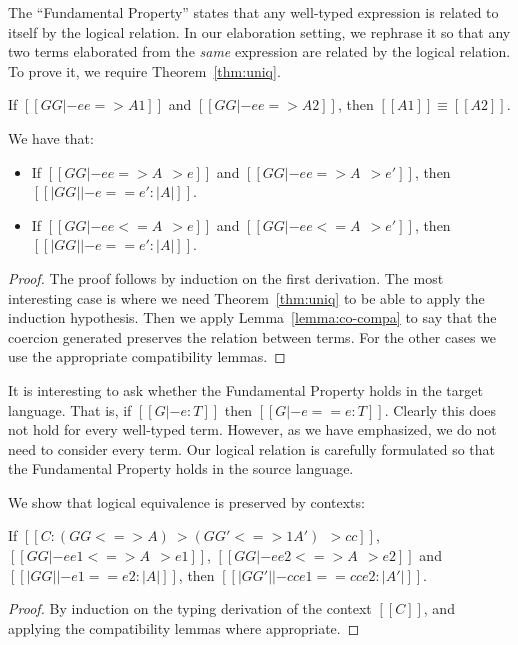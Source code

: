 The ``Fundamental Property'' states that any well-typed expression is related to
itself by the logical relation. In our elaboration setting, we rephrase it so
that any two \tname terms elaborated from the \textit{same} \name expression are related
by the logical relation. To prove it, we require Theorem~\ref{thm:uniq}.

\begin{theorem} \label{thm:uniq}
  If $[[GG |- ee => A1]]$ and $[[GG |- ee => A2]]$, then $[[A1]] \equiv [[A2]]$.
\end{theorem}

\begin{theorem}  \label{thm:co-log} We have that:
  \begin{itemize}
  \item If $[[GG |- ee => A ~~> e]]$ and $[[GG |- ee => A ~~> e']]$, then $[[|GG| |- e == e' : |A| ]]$.
  \item If $[[GG |- ee <= A ~~> e]]$ and $[[GG |- ee <= A ~~> e']]$, then $[[|GG| |- e == e' : |A| ]]$.
  \end{itemize}
\end{theorem}
\begin{proof}
  The proof follows by induction on the first derivation. The most interesting case is 
  where we need Theorem~\ref{thm:uniq} to be able to
  apply the induction hypothesis. Then we apply Lemma~\ref{lemma:co-compa} to say
  that the coercion generated preserves the relation between terms. For the other cases
  we use the appropriate compatibility lemmas.
\end{proof}
\begin{remark}
  It is interesting to ask whether the Fundamental Property holds in the target language. That is,
  if $[[G |- e : T]]$ then $[[G |- e == e : T]]$. Clearly this does not
  hold for every well-typed \tname term. However, as we have emphasized, we do
  not need to consider every \tname term. Our logical relation is carefully formulated
  so that the Fundamental Property holds in the source language.
\end{remark}


We show that logical equivalence is preserved by \name contexts:

\begin{lemma}[Congruence] \label{lemma:cong}
 If $[[C : (GG <=> A) ~> (GG' <=>1 A') ~~> cc]]$, $[[GG |- ee1 <=> A ~~> e1]]$, $[[GG |- ee2 <=> A ~~> e2]]$
 and $[[|GG| |- e1 == e2 : |A|]]$, then $[[|GG'| |- cc{e1} == cc{e2} : |A'|]]$.
\end{lemma}
\begin{proof}
  By induction on the typing derivation of the context $[[C]]$, and applying
  the compatibility lemmas where appropriate.
\end{proof}


